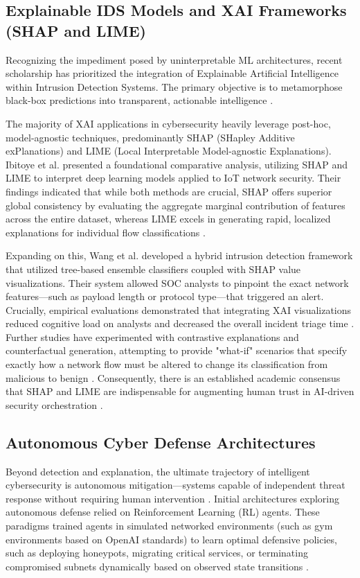 \documentclass[conference]{IEEEtran}
\begin{document}
\subsection{Explainable IDS Models and XAI Frameworks (SHAP and LIME)}
Recognizing the impediment posed by uninterpretable ML architectures, recent scholarship has prioritized the integration of Explainable Artificial Intelligence within Intrusion Detection Systems. The primary objective is to metamorphose black-box predictions into transparent, actionable intelligence \cite{stafford2020zero}.

The majority of XAI applications in cybersecurity heavily leverage post-hoc, model-agnostic techniques, predominantly SHAP (SHapley Additive exPlanations) and LIME (Local Interpretable Model-agnostic Explanations). Ibitoye et al. \cite{sharafaldin2018toward} presented a foundational comparative analysis, utilizing SHAP and LIME to interpret deep learning models applied to IoT network security. Their findings indicated that while both methods are crucial, SHAP offers superior global consistency by evaluating the aggregate marginal contribution of features across the entire dataset, whereas LIME excels in generating rapid, localized explanations for individual flow classifications \cite{moustafa2015unsw}. 

Expanding on this, Wang et al. \cite{mahbooba2021explainable} developed a hybrid intrusion detection framework that utilized tree-based ensemble classifiers coupled with SHAP value visualizations. Their system allowed SOC analysts to pinpoint the exact network features—such as payload length or protocol type—that triggered an alert. Crucially, empirical evaluations demonstrated that integrating XAI visualizations reduced cognitive load on analysts and decreased the overall incident triage time \cite{alotaibi2023adaptive}. Further studies have experimented with contrastive explanations and counterfactual generation, attempting to provide "what-if" scenarios that specify exactly how a network flow must be altered to change its classification from malicious to benign \cite{chen2016xgboost, ke2017lightgbm}. Consequently, there is an established academic consensus that SHAP and LIME are indispensable for augmenting human trust in AI-driven security orchestration \cite{ahmad2020network}.

\subsection{Autonomous Cyber Defense Architectures}
Beyond detection and explanation, the ultimate trajectory of intelligent cybersecurity is autonomous mitigation—systems capable of independent threat response without requiring human intervention \cite{wang2021explainable}. Initial architectures exploring autonomous defense relied on Reinforcement Learning (RL) agents. These paradigms trained agents in simulated networked environments (such as gym environments based on OpenAI standards) to learn optimal defensive policies, such as deploying honeypots, migrating critical services, or terminating compromised subnets dynamically based on observed state transitions \cite{lundberg2017unified, stafford2020zero}.
\end{document}
